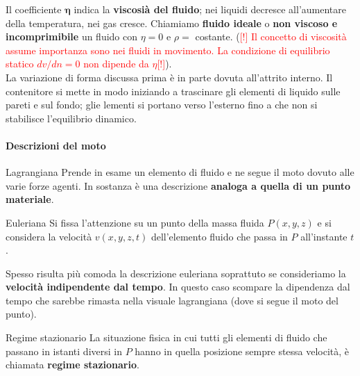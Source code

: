 \documentclass[x11names]{article}
\begin{document}
	Il coefficiente \(\boldsymbol{\eta}\) indica la \textbf{viscosià del fluido}; nei liquidi decresce all'aumentare della temperatura, nei gas cresce. Chiamiamo \textbf{fluido ideale} o \textbf{non viscoso e incomprimibile} un fluido con \(\eta = 0\) e \(\rho = \) costante.
	(\textcolor{red}{[!] Il concetto di viscosità assume importanza sono nei fluidi in movimento. La condizione di equilibrio statico  \(dv/dn = 0\) non dipende da \(\eta\)[!]}).
	\\
	
	
	\noindent
	La variazione di forma discussa prima è in parte dovuta all'attrito interno. Il contenitore si mette in modo iniziando a trascinare gli elementi di liquido sulle pareti e sul fondo; glie lementi si portano verso l'esterno fino a che non si stabilisce l'equilibrio dinamico.
	
	\paragraph{Descrizioni del moto}
	\begin{center}
		\begin{minipage}{0.49\textwidth}
			\begin{es}{Lagrangiana}
				Prende in esame un elemento di fluido e ne segue il moto dovuto alle varie forze agenti. In sostanza è una descrizione \textbf{analoga a quella di un punto materiale}.
			\end{es}
		\end{minipage}
		\begin{minipage}{0.49\textwidth}
			\begin{es}{Euleriana}
				Si fissa l'attenzione su un punto della massa fluida \(P(x,y,z)\) e si considera la velocità \(v(x,y,z,t)\) dell'elemento fluido che passa in \(P\) all'instante \(t\).
			\end{es}
		\end{minipage}
	\end{center}
	Spesso risulta più comoda la descrizione euleriana soprattuto se consideriamo la \textbf{velocità indipendente dal tempo}. In questo caso scompare la dipendenza dal tempo che sarebbe rimasta nella visuale lagrangiana (dove si segue il moto del punto).
	\begin{center}
		\colorbox{yblue}{\begin{minipage}{5.75in}
				\begin{blues}{Regime stazionario}
					La situazione fisica in cui tutti gli elementi di fluido che passano in istanti diversi in \(P\) hanno in quella posizione sempre stessa velocità, è chiamata \textbf{regime stazionario}.
				\end{blues}
		\end{minipage}}
	\end{center}
	
\end{document}
